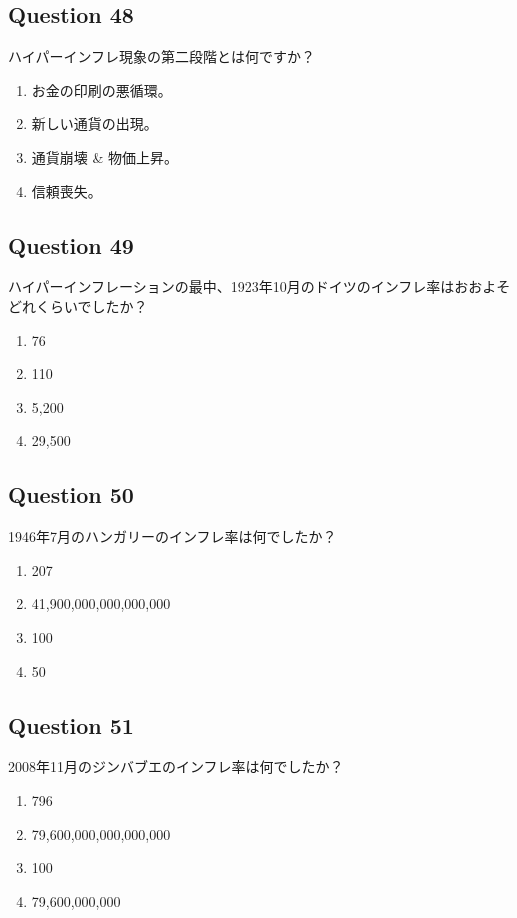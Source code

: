 \documentclass[12pt,a4paper]{article}
\begin{document}
\bigskip


\subsection*{Question 48}
ハイパーインフレ現象の第二段階とは何ですか？

\begin{enumerate}[label=\Alph*., leftmargin=*]
\item お金の印刷の悪循環。
\item 新しい通貨の出現。
\item 通貨崩壊 & 物価上昇。
\item 信頼喪失。
\end{enumerate}

\bigskip


\subsection*{Question 49}
ハイパーインフレーションの最中、1923年10月のドイツのインフレ率はおおよそどれくらいでしたか？

\begin{enumerate}[label=\Alph*., leftmargin=*]
\item 76%
\item 110%
\item 5,200%
\item 29,500%
\end{enumerate}

\bigskip


\subsection*{Question 50}
1946年7月のハンガリーのインフレ率は何でしたか？

\begin{enumerate}[label=\Alph*., leftmargin=*]
\item 207%
\item 41,900,000,000,000,000%
\item 100%
\item 50%
\end{enumerate}

\bigskip


\subsection*{Question 51}
2008年11月のジンバブエのインフレ率は何でしたか？

\begin{enumerate}[label=\Alph*., leftmargin=*]
\item 796%
\item 79,600,000,000,000,000%
\item 100%
\item 79,600,000,000%
\end{enumerate}
\end{document}
